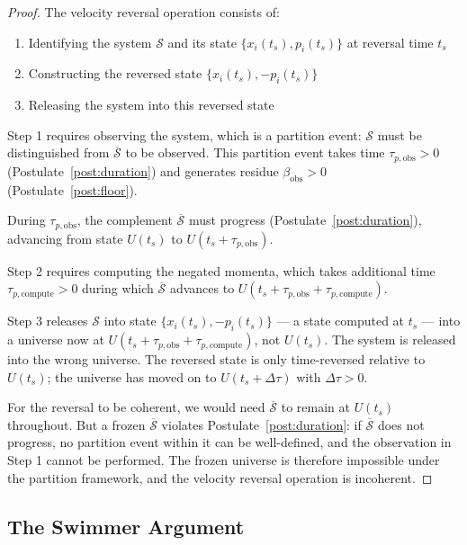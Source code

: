 \begin{proof}
The velocity reversal operation consists of:
\begin{enumerate}
    \item Identifying the system $\mathcal{S}$ and its state $\{x_i(t_s),
          p_i(t_s)\}$ at reversal time $t_s$
    \item Constructing the reversed state $\{x_i(t_s), -p_i(t_s)\}$
    \item Releasing the system into this reversed state
\end{enumerate}
Step 1 requires observing the system, which is a partition event: $\mathcal{S}$
must be distinguished from $\overline{\mathcal{S}}$ to be observed. This
partition event takes time $\tau_{p,\mathrm{obs}} > 0$
(Postulate~\ref{post:duration}) and generates residue
$\beta_{\mathrm{obs}} > 0$ (Postulate~\ref{post:floor}).

During $\tau_{p,\mathrm{obs}}$, the complement $\overline{\mathcal{S}}$ must
progress (Postulate~\ref{post:duration}), advancing from state $U(t_s)$ to
$U(t_s + \tau_{p,\mathrm{obs}})$.

Step 2 requires computing the negated momenta, which takes additional time
$\tau_{p,\mathrm{compute}} > 0$ during which $\overline{\mathcal{S}}$ advances
to $U(t_s + \tau_{p,\mathrm{obs}} + \tau_{p,\mathrm{compute}})$.

Step 3 releases $\mathcal{S}$ into state $\{x_i(t_s), -p_i(t_s)\}$ --- a state
computed at $t_s$ --- into a universe now at
$U(t_s + \tau_{p,\mathrm{obs}} + \tau_{p,\mathrm{compute}})$, not $U(t_s)$. The
system is released into the wrong universe. The reversed state is only
time-reversed relative to $U(t_s)$; the universe has moved on to
$U(t_s + \Delta\tau)$ with $\Delta\tau > 0$.

For the reversal to be coherent, we would need $\overline{\mathcal{S}}$ to
remain at $U(t_s)$ throughout. But a frozen $\overline{\mathcal{S}}$ violates
Postulate~\ref{post:duration}: if $\overline{\mathcal{S}}$ does not progress,
no partition event within it can be well-defined, and the observation in Step 1
cannot be performed. The frozen universe is therefore impossible under the
partition framework, and the velocity reversal operation is incoherent.
\end{proof}

\subsection{The Swimmer Argument}
\label{subsec:swimmer}

